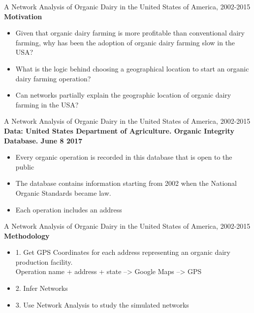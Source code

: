 \documentclass[20]{beamer}
\begin{document}
\begin{frame}{A Network Analysis of Organic Dairy in the United States of America, 2002-2015}
\textbf{Motivation}
\\ 
\begin{itemize}
\item Given that organic dairy farming is more profitable than conventional dairy farming, why has been the adoption of organic dairy farming slow in the USA?
\item  What is the logic behind choosing a geographical location to start an organic dairy farming operation?
\item  Can networks partially explain the geographic location of organic dairy farming in the USA?
\end{itemize}
\end{frame}


\begin{frame}{A Network Analysis of Organic Dairy in the United States of America, 2002-2015}
\textbf{Data: United States Department of Agriculture. Organic Integrity Database. June 8 2017}
\\ 
\begin{itemize}
\item Every organic operation is recorded in this database that is open to the public
\item The database contains information starting from 2002 when the National Organic Standards became law.
\item Each operation includes an address
\end{itemize}
\end{frame}


\begin{frame}{A Network Analysis of Organic Dairy in the United States of America, 2002-2015}
\textbf{Methodology}
\\ 
\begin{itemize}
\item 1. Get GPS Coordinates for each address representing an organic dairy production facility. \\ Operation name + address + state --> Google Maps --> GPS
\item 2. Infer Networks
\item 3. Use Network Analysis to study the simulated networks 
\end{itemize}
\end{frame}
\end{document}
